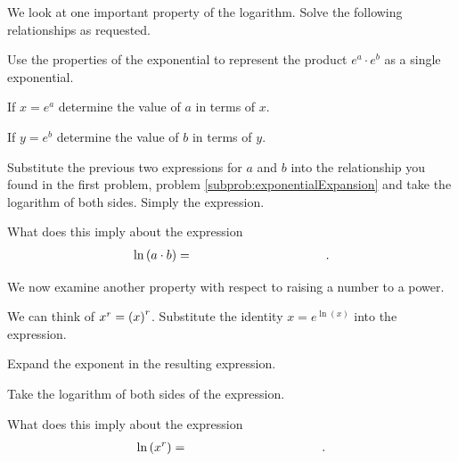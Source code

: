 \begin{problem}
\item We look at one important property of the logarithm. Solve the
  following relationships as requested.
  \begin{subproblem}
  \item Use the properties of the exponential to represent the product
    $e^a\cdot e^b$ as a single exponential.
    \label{subprob:exponentialExpansion}
    \vfill
  \item If $x=e^a$ determine the value of $a$ in terms of $x$.
    \vfill
  \item If $y=e^b$ determine the value of $b$ in terms of $y$.
    \vfill
  \item Substitute the previous two expressions for $a$ and $b$ into
    the relationship you found in the first problem, problem
    \ref{subprob:exponentialExpansion} and take the logarithm of both
    sides. Simply the expression.
    \vfill
  \item What does this imply about the expression 
    \begin{eqnarray*}
      \ln\lp a \cdot b \rp & = & \hspace{10em}.
    \end{eqnarray*}
  \end{subproblem}

  \clearpage

\item We now examine another property with respect to raising a number
  to a power.
  \begin{subproblem}
  \item We can think of $x^r=\left( x \right)^r$. Substitute the identity
    $x=e^{\ln(x)}$ into the expression.
      \vfill
    \item Expand the exponent in the resulting expression.
      \vfill
    \item Take the logarithm of both sides of the expression.
      \vfill
    \item What does this imply about the expression
    \begin{eqnarray*}
      \ln\lp x^r \rp & = & \hspace{10em}.
    \end{eqnarray*}
  \end{subproblem}

\clearpage


\end{problem}

